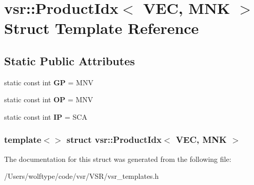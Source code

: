 \hypertarget{structvsr_1_1_product_idx_3_01_v_e_c_00_01_m_n_k_01_4}{\section{vsr\-:\-:Product\-Idx$<$ V\-E\-C, M\-N\-K $>$ Struct Template Reference}
\label{structvsr_1_1_product_idx_3_01_v_e_c_00_01_m_n_k_01_4}
}
\subsection*{Static Public Attributes}
\begin{DoxyCompactItemize}
\item 
\hypertarget{structvsr_1_1_product_idx_3_01_v_e_c_00_01_m_n_k_01_4_a01d32fdb7fe05bf504c06b94c32b7883}{static const int {\bfseries G\-P} = M\-N\-V}\label{structvsr_1_1_product_idx_3_01_v_e_c_00_01_m_n_k_01_4_a01d32fdb7fe05bf504c06b94c32b7883}

\item 
\hypertarget{structvsr_1_1_product_idx_3_01_v_e_c_00_01_m_n_k_01_4_a9a5c1de7c996ff2bc3b0a8f1ed0763b3}{static const int {\bfseries O\-P} = M\-N\-V}\label{structvsr_1_1_product_idx_3_01_v_e_c_00_01_m_n_k_01_4_a9a5c1de7c996ff2bc3b0a8f1ed0763b3}

\item 
\hypertarget{structvsr_1_1_product_idx_3_01_v_e_c_00_01_m_n_k_01_4_a521ae19ae486338dfc92f5c7f70c1da5}{static const int {\bfseries I\-P} = S\-C\-A}\label{structvsr_1_1_product_idx_3_01_v_e_c_00_01_m_n_k_01_4_a521ae19ae486338dfc92f5c7f70c1da5}

\end{DoxyCompactItemize}
\subsubsection*{template$<$$>$ struct vsr\-::\-Product\-Idx$<$ V\-E\-C, M\-N\-K $>$}



The documentation for this struct was generated from the following file\-:\begin{DoxyCompactItemize}
\item 
/\-Users/wolftype/code/vsr/\-V\-S\-R/vsr\-\_\-templates.\-h\end{DoxyCompactItemize}

